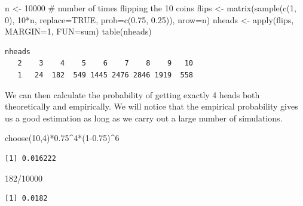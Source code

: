 \documentclass[
  letterpaper,
  DIV=11,
  numbers=noendperiod]{scrreprt}
\newenvironment{Shaded}{\begin{snugshade}}{\end{snugshade}}
\newcommand{\AttributeTok}[1]{\textcolor[rgb]{0.40,0.45,0.13}{#1}}
\newcommand{\CommentTok}[1]{\textcolor[rgb]{0.37,0.37,0.37}{#1}}
\newcommand{\ConstantTok}[1]{\textcolor[rgb]{0.56,0.35,0.01}{#1}}
\newcommand{\DecValTok}[1]{\textcolor[rgb]{0.68,0.00,0.00}{#1}}
\newcommand{\FloatTok}[1]{\textcolor[rgb]{0.68,0.00,0.00}{#1}}
\newcommand{\FunctionTok}[1]{\textcolor[rgb]{0.28,0.35,0.67}{#1}}
\newcommand{\NormalTok}[1]{\textcolor[rgb]{0.00,0.23,0.31}{#1}}
\newcommand{\OtherTok}[1]{\textcolor[rgb]{0.00,0.23,0.31}{#1}}
\newcommand{\SpecialCharTok}[1]{\textcolor[rgb]{0.37,0.37,0.37}{#1}}
\begin{document}
\begin{Shaded}
\begin{Highlighting}[]
\NormalTok{n }\OtherTok{\textless{}{-}} \DecValTok{10000} \CommentTok{\# number of times flipping the 10 coins}
\NormalTok{flips }\OtherTok{\textless{}{-}} \FunctionTok{matrix}\NormalTok{(}\FunctionTok{sample}\NormalTok{(}\FunctionTok{c}\NormalTok{(}\DecValTok{1}\NormalTok{, }\DecValTok{0}\NormalTok{), }\DecValTok{10}\SpecialCharTok{*}\NormalTok{n, }\AttributeTok{replace=}\ConstantTok{TRUE}\NormalTok{, }\AttributeTok{prob=}\FunctionTok{c}\NormalTok{(}\FloatTok{0.75}\NormalTok{, }\FloatTok{0.25}\NormalTok{)), }\AttributeTok{nrow=}\NormalTok{n)}
\NormalTok{nheads }\OtherTok{\textless{}{-}} \FunctionTok{apply}\NormalTok{(flips, }\AttributeTok{MARGIN=}\DecValTok{1}\NormalTok{, }\AttributeTok{FUN=}\NormalTok{sum)}
\FunctionTok{table}\NormalTok{(nheads)}
\end{Highlighting}
\end{Shaded}

\begin{verbatim}
nheads
   2    3    4    5    6    7    8    9   10 
   1   24  182  549 1445 2476 2846 1919  558 
\end{verbatim}

We can then calculate the probability of getting exactly 4 heads both
theoretically and empirically. We will notice that the empirical
probability gives us a good estimation as long as we carry out a large
number of simulations.

\begin{Shaded}
\begin{Highlighting}[]
\FunctionTok{choose}\NormalTok{(}\DecValTok{10}\NormalTok{,}\DecValTok{4}\NormalTok{)}\SpecialCharTok{*}\FloatTok{0.75}\SpecialCharTok{\^{}}\DecValTok{4}\SpecialCharTok{*}\NormalTok{(}\DecValTok{1}\FloatTok{{-}0.75}\NormalTok{)}\SpecialCharTok{\^{}}\DecValTok{6}
\end{Highlighting}
\end{Shaded}

\begin{verbatim}
[1] 0.016222
\end{verbatim}

\begin{Shaded}
\begin{Highlighting}[]
\DecValTok{182}\SpecialCharTok{/}\DecValTok{10000}
\end{Highlighting}
\end{Shaded}

\begin{verbatim}
[1] 0.0182
\end{verbatim}
\end{document}
